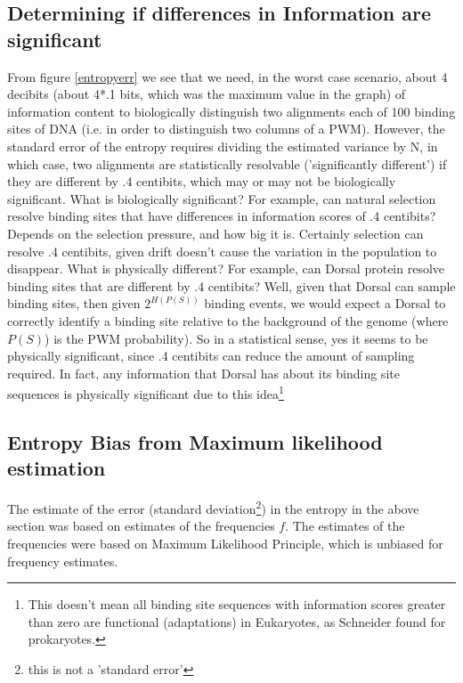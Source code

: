 \subsection*{Determining if differences in Information are significant}

From figure \ref{entropyerr} we see that we need, in the worst case scenario, about 4 decibits (about 4*.1 bits, which was the maximum value in the graph) of information content to biologically distinguish two alignments each of 100 binding sites of DNA (i.e. in order to distinguish two columns of a PWM).  However, the standard error of the entropy requires dividing the estimated variance by N, in which case, two alignments are statistically resolvable ('significantly different') if they are different by .4 centibits, which may or may not be biologically significant.  What is biologically significant?  For example, can natural selection resolve binding sites that have differences in information scores of .4 centibits?  Depends on the selection pressure, and how big it is.  Certainly selection can resolve .4 centibits, given drift doesn't cause the variation in the population to disappear.  What is physically different?  For example, can Dorsal protein resolve binding sites that are different by .4 centibits?  Well, given that Dorsal can sample binding sites, then given $2^{H(P(S))}$ binding events, we would expect a Dorsal to correctly identify a binding site relative to the background of the genome (where $P(S)$) is the PWM probability).  So in a statistical sense, yes it seems to be physically significant, since .4 centibits can reduce the amount of sampling required.  In fact, any information that Dorsal has about its binding site sequences is physically significant due to this idea\footnote{This doesn't mean all binding site sequences with information scores greater than zero are functional (adaptations) in Eukaryotes, as Schneider found for prokaryotes\cite{pmid3525846}.}  


\subsection*{Entropy Bias from Maximum likelihood estimation}
The estimate of the error (standard deviation\footnote{this is not a 'standard error'}) in the entropy in the above section was based on estimates of the frequencies $f$.  The estimates of the frequencies were based on Maximum Likelihood  Principle, which is unbiased for frequency estimates.  

